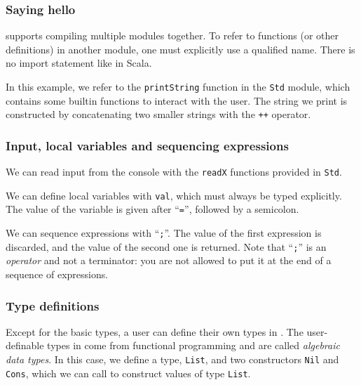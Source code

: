 \subsubsection{Saying hello}

\begin{figure}[h]
    
\end{figure}

\langname supports compiling multiple modules together.
To refer to functions (or other definitions) in another module,
one must explicitly use a qualified name.
There is no import statement like in Scala.

In this example, we refer to the \lstinline{printString} function in the
\lstinline{Std} module, which contains some builtin functions to interact with the user.
The string we print is constructed by concatenating two smaller strings
with the \lstinline{++} operator.

\subsubsection{Input, local variables and sequencing expressions}

\begin{figure}[h]
    
\end{figure}

We can read input from the console with the \lstinline{readX} functions
provided in \lstinline{Std}.

We can define local variables with \lstinline{val},
which must always be typed explicitly.
The value of the variable is given after ``\lstinline{=}'',
followed by a semicolon.

We can sequence expressions with ``\lstinline{;}''.
The value of the first expression is discarded,
and the value of the second one is returned.
Note that ``\lstinline{;}'' is an \emph{operator}
and not a terminator: you are not allowed to put it 
at the end of a sequence of expressions.

\subsubsection{Type definitions}

\begin{figure}[h]
    
\end{figure}

Except for the basic types, a user can define their own types in \langname.
The user-definable types in \langname come from functional programming and
are called \emph{algebraic data types}.
In this case, we define a type, \lstinline{List},
and two constructors \lstinline{Nil} and \lstinline{Cons},
which we can call to construct values of type \lstinline{List}.

